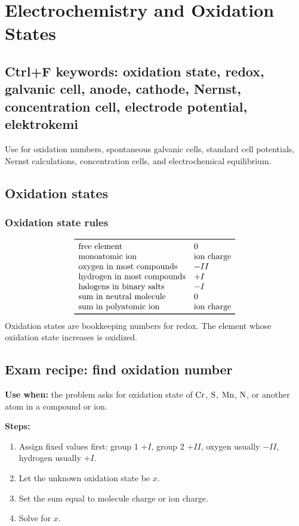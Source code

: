 \section{Electrochemistry and Oxidation States}

\subsection{Ctrl+F keywords: oxidation state, redox, galvanic cell, anode, cathode, Nernst, concentration cell, electrode potential, elektrokemi}
Use for oxidation numbers, spontaneous galvanic cells, standard cell potentials, Nernst calculations, concentration cells, and electrochemical equilibrium.

\subsection{Oxidation states}

\subsubsection{Oxidation state rules}
\[
\begin{array}{l l}
\toprule
\text{free element} & 0\\
\text{monoatomic ion} & \text{ion charge}\\
\text{oxygen in most compounds} & -II\\
\text{hydrogen in most compounds} & +I\\
\text{halogens in binary salts} & -I\\
\text{sum in neutral molecule} & 0\\
\text{sum in polyatomic ion} & \text{ion charge}\\
\bottomrule
\end{array}
\]
Oxidation states are bookkeeping numbers for redox. The element whose oxidation state increases is oxidized.

\subsection{Exam recipe: find oxidation number}
\textbf{Use when:} the problem asks for oxidation state of \(\ce{Cr}\), \(\ce{S}\), \(\ce{Mn}\), \(\ce{N}\), or another atom in a compound or ion.

\textbf{Steps:}
\begin{enumerate}
    \item Assign fixed values first: group 1 \(+I\), group 2 \(+II\), oxygen usually \(-II\), hydrogen usually \(+I\).
    \item Let the unknown oxidation state be \(x\).
    \item Set the sum equal to molecule charge or ion charge.
    \item Solve for \(x\).
\end{enumerate}

